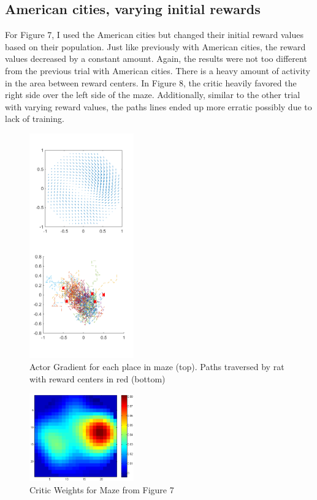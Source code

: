 \documentclass[conference]{IEEEtran}
\begin{document}
\subsection{American cities, varying initial rewards}

For Figure 7, I used the American cities but changed their initial reward values based on their population. Just like previously with American cities, the reward values decreased by a constant amount. Again, the results were not too different from the previous trial with American cities. There is a heavy amount of activity in the area between reward centers. In Figure 8, the critic heavily favored the right side over the left side of the maze. Additionally, similar to the other trial with varying reward values, the paths lines ended up more erratic possibly due to lack of training.  

\begin{figure}
\includegraphics[width=0.4\textwidth]{waterMazeRevisedD_Figure_populationRewards.png} 
\caption{Actor Gradient for each place in maze (top). Paths traversed by rat with reward centers in red (bottom)}
\end{figure}

\begin{figure}
\includegraphics[width=0.4\textwidth]{waterMazeRevisedD_Critic_populationRewards.png} 
\caption{Critic Weights for Maze from Figure 7}
\end{figure}
\end{document}
